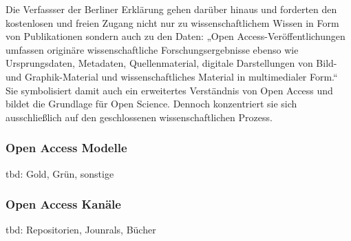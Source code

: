 Die Verfassser der Berliner Erklärung gehen darüber hinaus und forderten den kostenlosen und freien Zugang nicht nur zu wissenschaftlichem Wissen in Form von Publikationen sondern auch zu den Daten: „Open Access-Veröffentlichungen umfassen originäre wissenschaftliche Forschungsergebnisse ebenso wie Ursprungsdaten, Metadaten, Quellenmaterial, digitale Darstellungen von Bild- und Graphik-Material und wissenschaftliches Material in multimedialer Form.“  Sie symbolisiert damit auch ein erweitertes Verständnis von Open Access und bildet die Grundlage für Open Science. Dennoch konzentriert sie sich ausschließlich auf den geschlossenen wissenschaftlichen Prozess.

\subsubsection{Open Access Modelle}
tbd: Gold, Grün, sonstige

\subsubsection{Open Access Kanäle}
tbd: Repositorien, Jounrals, Bücher